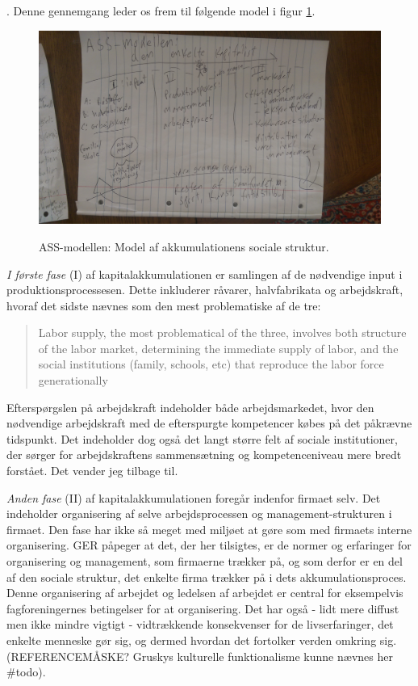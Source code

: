 %
.
Denne gennemgang leder os frem til følgende model i figur \ref{fig_ASSmodel}.
%
\begin{figure}[H]
\begin{centering}
	\caption{ASS-modellen: Model af akkumulationens sociale struktur.}
	\includegraphics[width=\textwidth]{fig/ASS-model.jpg}
	\label{fig_ASSmodel}
\end{centering}
\end{figure}
%

\emph{I første fase} (I) af kapitalakkumulationen er samlingen af de nødvendige input i produktionsprocessesen. Dette inkluderer råvarer, halvfabrikata og arbejdskraft, hvoraf det sidste nævnes som den mest problematiske af de tre:  
%
\begin{quote} \small %
Labor supply, the most problematical of the three, involves both structure of the labor market, determining the immediate supply of labor, and the social institutions (family, schools, etc) that reproduce the labor force generationally \label{aksocstruk}
\end{quote}
%
Efterspørgslen på arbejdskraft indeholder både arbejdsmarkedet, hvor den nødvendige arbejdskraft med de efterspurgte kompetencer købes på det påkrævne tidspunkt. Det indeholder dog også det langt større felt af sociale institutioner, der sørger for arbejdskraftens sammensætning og kompetenceniveau mere bredt forstået. Det vender jeg tilbage til.


\emph{Anden fase} (II) af kapitalakkumulationen foregår indenfor firmaet selv. Det indeholder organisering af selve arbejdsprocessen og management-strukturen i firmaet. Den fase har ikke så meget med miljøet at gøre som med firmaets interne organisering. GER påpeger at det, der her tilsigtes, er de normer og erfaringer for organisering og management, som firmaerne trækker på, og som derfor er en del af den sociale struktur, det enkelte firma trækker på i dets akkumulationsproces. Denne organisering af arbejdet og ledelsen af arbejdet er central for eksempelvis fagforeningernes betingelser for at organisering. Det har også - lidt mere diffust men ikke mindre vigtigt - vidtrækkende konsekvenser for de livserfaringer, det enkelte menneske gør sig, og dermed hvordan det fortolker verden omkring sig. (REFERENCEMÅSKE? Gruskys kulturelle funktionalisme kunne nævnes her \#todo). 

